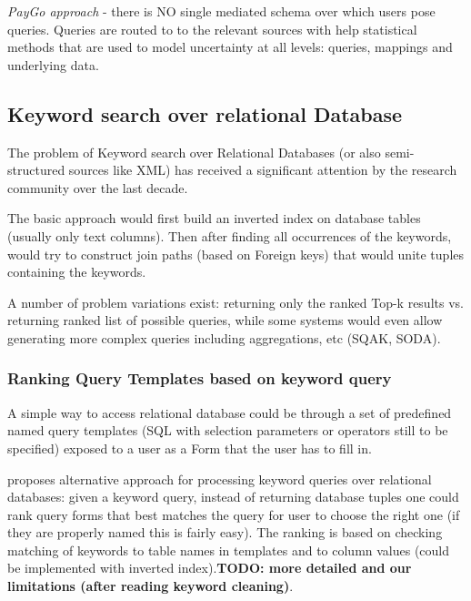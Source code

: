 \textit{PayGo approach}\cite{webscale_paygo}  - there is NO single mediated schema over which users pose queries. Queries are routed to to the relevant sources with help statistical methods that are used to model uncertainty at all levels: queries, mappings and underlying data.




\subsection{Keyword search over relational Database}
The problem of Keyword search over Relational Databases (or also semi-structured sources like XML) has received a significant attention by the research community over the last decade. 

The basic approach would first build an inverted index on database tables (usually only text columns). Then after finding all occurrences of the keywords, would try to construct join paths (based on Foreign keys) that would unite tuples containing the keywords.

% 
A number of problem variations exist:  returning only the ranked Top-k results vs. returning ranked list of possible queries, while some systems would even allow generating more complex queries including aggregations, etc (SQAK, SODA\cite{ethz2012}).

\subsubsection*{Ranking Query Templates based on keyword query}
A simple way to access relational database could  be through a set of predefined named query templates (SQL with selection parameters or operators still to be specified) exposed to a user as a Form that the user has to fill in.

\cite{forms_kws} proposes alternative approach for processing keyword queries over relational databases: given a keyword query, instead of returning database tuples one could rank query forms that best matches the query for user to choose the right one (if they are properly named this is fairly easy). The ranking is based on checking matching of keywords to table names in templates and to column values (could be implemented with inverted index).\textbf{\color{red}TODO: more detailed and our limitations (after reading keyword cleaning)}.

